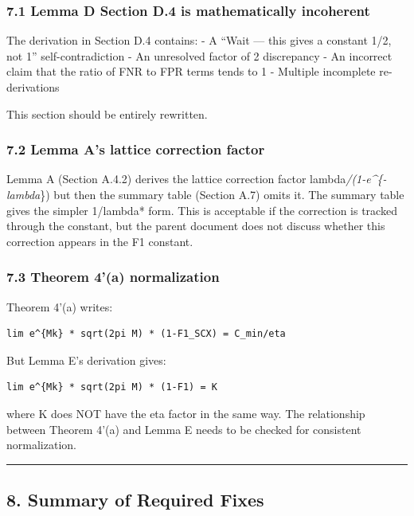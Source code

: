 \documentclass[
  12pt,
]{article}
\begin{document}
\subsubsection{7.1 Lemma D Section D.4 is mathematically
incoherent}\label{lemma-d-section-d.4-is-mathematically-incoherent}

The derivation in Section D.4 contains: - A ``Wait --- this gives a
constant 1/2, not 1'' self-contradiction - An unresolved factor of 2
discrepancy - An incorrect claim that the ratio of FNR to FPR terms
tends to 1 - Multiple incomplete re-derivations

This section should be entirely rewritten.

\subsubsection{7.2 Lemma A's lattice correction
factor}\label{lemma-as-lattice-correction-factor}

Lemma A (Section A.4.2) derives the lattice correction factor
lambda\emph{/(1-e\^{}\{-lambda}\}) but then the summary table (Section
A.7) omits it. The summary table gives the simpler 1/lambda* form. This
is acceptable if the correction is tracked through the constant, but the
parent document does not discuss whether this correction appears in the
F1 constant.

\subsubsection{7.3 Theorem 4'(a)
normalization}\label{theorem-4a-normalization}

Theorem 4'(a) writes:

\begin{verbatim}
lim e^{Mk} * sqrt(2pi M) * (1-F1_SCX) = C_min/eta
\end{verbatim}

But Lemma E's derivation gives:

\begin{verbatim}
lim e^{Mk} * sqrt(2pi M) * (1-F1) = K
\end{verbatim}

where K does NOT have the eta factor in the same way. The relationship
between Theorem 4'(a) and Lemma E needs to be checked for consistent
normalization.

\begin{center}\rule{0.5\linewidth}{0.5pt}\end{center}

\subsection{8. Summary of Required
Fixes}\label{summary-of-required-fixes}
\end{document}
